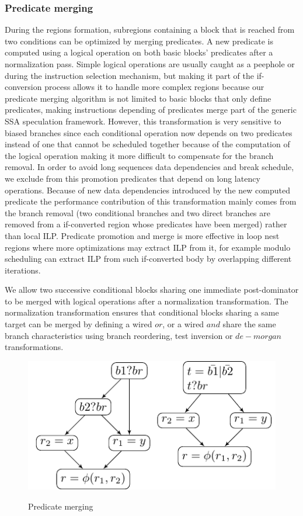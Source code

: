 \subsubsection{Predicate merging}

During the regions formation, subregions containing a block that is reached from two conditions can be optimized by merging predicates. A new predicate is computed using a logical operation on both basic blocks' predicates after a normalization pass. Simple logical operations are usually caught as a peephole or during the instruction selection mechanism, but making it part of the if-conversion process allows it to handle more complex regions because our predicate merging algorithm is not limited to basic blocks that only define predicates, making instructions depending of predicates merge part of the generic SSA speculation framework. However, this transformation is very sensitive to biased branches since each conditional operation now depends on two predicates instead of one that cannot be scheduled together because of the computation of the logical operation making it more difficult to compensate for the branch removal. In order to avoid long sequences data dependencies and break schedule, we exclude from this promotion predicates that depend on long latency operations.
Because of new data dependencies introduced by the new computed predicate the performance contribution of this transformation mainly comes from the branch removal (two conditional branches and two direct branches are removed from a if-converted region whose predicates have been merged) rather than local ILP. Predicate promotion and merge is more effective in loop nest regions where more optimizations may extract ILP from it, for example modulo scheduling can extract ILP from such if-converted body by overlapping different iterations. 

We allow two successive conditional blocks sharing one immediate post-dominator to be merged with logical operations after a normalization transformation. The normalization transformation ensures that conditional blocks sharing a same target can be merged by defining a wired $or$, or a wired $and$ share the same branch characteristics using branch reordering, test inversion or $de-morgan$ transformations.

\begin{figure}
  \includegraphics[scale=0.8]{phi_merge}
  \label{fig:phi_merge}
\caption{Predicate merging}
\end{figure}

